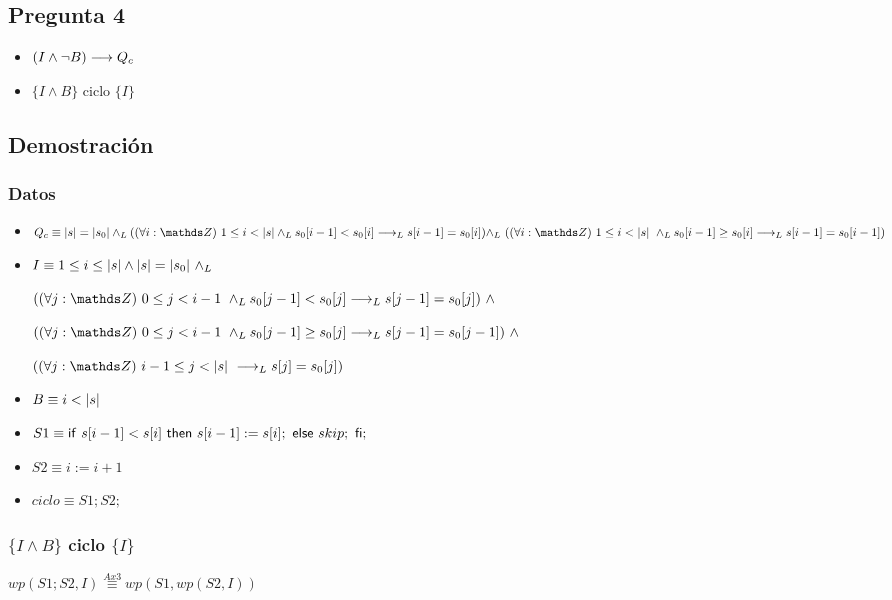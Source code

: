 \documentclass{article}
\begin{document}
\subsection*{Pregunta 4}
\begin{itemize}
    \item $(I \wedge \neg B) \longrightarrow Q_{c}$
    \item $\{I \wedge B\}$ ciclo $\{ I \}$
\end{itemize}

\subsection*{Demostración}
\subsubsection*{Datos}
\begin{itemize}
    \item $Q_{c}    \equiv \longitud{s} = \longitud{s_0} \yLuego (\paraTodo{i}{1}{\longitud{s} \yLuego s_0[i-1] < s_0[i] \implicaLuego s[i-1]=s_0[i])  \yLuego $
    
    $(\paraTodo{i}{1}{\longitud{s}} \yLuego s_0[i-1] \geq s_0[i] \implicaLuego s[i-1] = s_0[i-1])}$

    \item $I        \equiv 1 \leq i \leq |s| \wedge |s| = |s_0|\ \land _L$

    $(\paraTodo{j}{0}{i-1} \yLuego s_0[j-1] < s_0[j] \implicaLuego s[j-1] = s_0[j])\ \wedge $

    $(\paraTodo{j}{0}{i-1} \yLuego s_0[j-1] \geq s_0[j] \implicaLuego s[j-1] = s_0[j-1])\ \wedge $

    $(\paraTodo{j}{i-1}{\longitud{s}} \implicaLuego s[j] = s_0[j])$

    \item $B        \equiv i < |s|$
    \item $S1       \equiv \mathsf{if}\ s[i-1] < s[i]\ \mathsf{then}\ s[i-1]:= s[i];\ \mathsf{else}\ skip;\ \mathsf{fi};$
    \item $S2       \equiv i := i + 1$
    \item $ciclo    \equiv S1;S2;$
\end{itemize}

\subsubsection*{$\{I \wedge B\}$ ciclo $\{ I \}$}

$wp(S1;S2, I) \stackrel{Ax3}{\equiv} wp(S1, wp(S2, I))$
\end{document}
